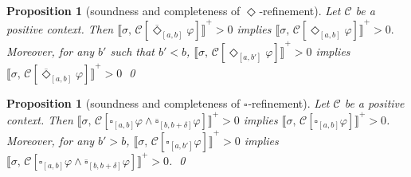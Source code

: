 \documentclass[envcountsect,orivec]{llncs} \usepackage{etex} \usepackage[]{graphicx}
\newtheorem{myproposition}[mytheorem]{Proposition}
\def\myqed{\qed}
\newcommand{\DiaOp}[1]{\Diamond_{#1}}
\newcommand{\BoxOp}[1]{\square_{#1}}
\newcommand{\TDiaOp}[1]{\overline{\Diamond}_{#1}}
\newcommand{\TBoxOp}[1]{\overline{\square}_{#1}}
\newcommand{\Robust}[2]{{ \llbracket #1,\, #2 \rrbracket}}
\newcommand{\C}{\mathcal{C}}
\begin{document}
\noindent
\begin{minipage}{\textwidth}
 \begin{myproposition}[soundness and completeness of $\DiaOp{}$-refinement]
 \label{prop:diaBoxReplacement}
 \label{prop:diaRefinement}
  Let $\C$ be a positive context.
  Then
  \begin{math}
    \Robust{\sigma}{\C[\TDiaOp{[a,b]}\varphi]}^{+} > 0
  \end{math}
  implies
  \begin{math}
    \Robust{\sigma}{\C[\DiaOp{[a,b]}\varphi]}^{+} > 0.
  \end{math}
  Moreover, for any $b'$ such that
  \begin{math}
    b' < b
  \end{math},
  \begin{math}
    \Robust{\sigma}{\C[\DiaOp{[a,b']}\varphi]}^{+} > 0
  \end{math}
  implies
  \begin{math}
    \Robust{\sigma}{\C[\TDiaOp{[a,b]}\varphi]}^{+} > 0
  \end{math}
  \myqed
 \end{myproposition}
\end{minipage}

\noindent
\begin{minipage}{\textwidth}
\begin{myproposition}[soundness and completeness of $\BoxOp{}$-refinement]
\label{prop:BoxRefinement}
  Let $\C$ be a positive context.
  Then
  \begin{math} 
    \Robust{\sigma}{\C[\BoxOp{[a,b]}\varphi \wedge \TBoxOp{[b,b+\delta]}\varphi]}^{+} > 0
  \end{math}
  implies
\begin{math}
    \Robust{\sigma}{\C[\BoxOp{[a,b]}\varphi]}^{+} > 0 
  \end{math}. 
 Moreover, for any $b'>b$, 
  \begin{math}
    \Robust{\sigma}{\C[\BoxOp{[a,b']}\varphi]}^{+} > 0 
  \end{math} implies
\begin{math}
    \Robust{\sigma}{\C[\BoxOp{[a,b]}\varphi \wedge \TBoxOp{[b,b+\delta]}\varphi]}^{+} > 0
  \end{math}.
  \myqed
\end{myproposition}
\end{minipage}
\end{document}
